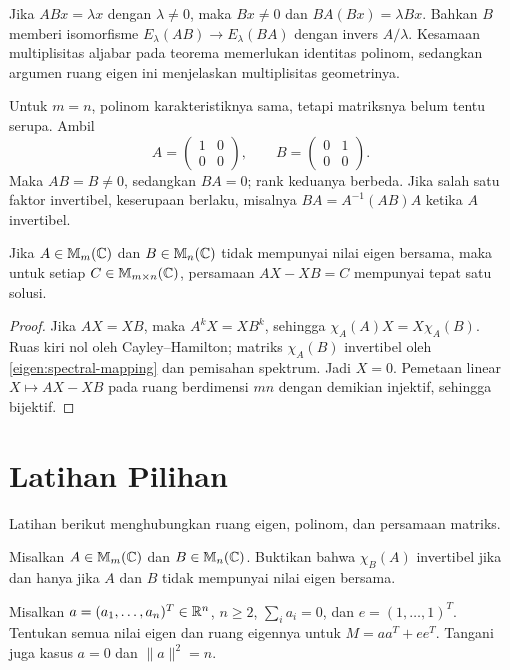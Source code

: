 Jika $ABx=\lambda x$ dengan $\lambda\ne0$, maka $Bx\ne0$ dan
$BA(Bx)=\lambda Bx$. Bahkan $B$ memberi isomorfisme
$E_\lambda(AB)\to E_\lambda(BA)$ dengan invers $A/\lambda$.
Kesamaan multiplisitas aljabar pada teorema memerlukan identitas polinom,
sedangkan argumen ruang eigen ini menjelaskan multiplisitas geometrinya.

Untuk $m=n$, polinom karakteristiknya sama, tetapi matriksnya belum
tentu serupa. Ambil
\[
    A=\begin{pmatrix}1&0\\0&0\end{pmatrix},\qquad
    B=\begin{pmatrix}0&1\\0&0\end{pmatrix}.
\]
Maka $AB=B\ne0$, sedangkan $BA=0$; rank keduanya berbeda.
Jika salah satu faktor invertibel, keserupaan berlaku, misalnya
$BA=A^{-1}(AB)A$ ketika $A$ invertibel.

\begin{prop}
    \label{eigen:sylvester}
    Jika $A\in\mathbb{M}_m(\mathbb{C})$ dan $B\in\mathbb{M}_n(\mathbb{C})$ tidak mempunyai
    nilai eigen bersama, maka untuk setiap $C\in\mathbb{M}_{m\times n}(\mathbb{C})$,
    persamaan $AX-XB=C$ mempunyai tepat satu solusi.
\end{prop}
\begin{proof}
    Jika $AX=XB$, maka $A^kX=XB^k$, sehingga
    $\chi_A(A)X=X\chi_A(B)$.
    Ruas kiri nol oleh Cayley--Hamilton; matriks $\chi_A(B)$
    invertibel oleh \autoref{eigen:spectral-mapping} dan pemisahan spektrum.
    Jadi $X=0$.
    Pemetaan linear $X\mapsto AX-XB$ pada ruang berdimensi $mn$
    dengan demikian injektif, sehingga bijektif.
\end{proof}

\section{Latihan Pilihan}
\label{eigen:latihan}

Latihan berikut menghubungkan ruang eigen, polinom, dan persamaan matriks.

\begin{latihan}\label{eigen:lat-polinom}
    Misalkan $A\in\mathbb{M}_m(\mathbb{C})$ dan $B\in\mathbb{M}_n(\mathbb{C})$.
    Buktikan bahwa $\chi_B(A)$ invertibel jika dan hanya jika
    $A$ dan $B$ tidak mempunyai nilai eigen bersama.
\end{latihan}

\begin{latihan}\label{eigen:lat-dua-rankone}
    Misalkan $a=(a_1,\ldots,a_n)^T\in\mathbb{R}^n$, $n\ge2$,
    $\sum_i a_i=0$, dan $e=(1,\ldots,1)^T$.
    Tentukan semua nilai eigen dan ruang eigennya untuk $M=aa^T+ee^T$.
    Tangani juga kasus $a=0$ dan $\|a\|^2=n$.
\end{latihan}

